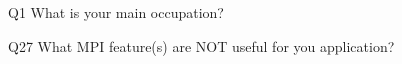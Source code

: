 \begin{description}%
\item{Q1} What is your main occupation?%
\item{Q27} What MPI feature(s) are NOT useful for you application?%
\end{description}%
